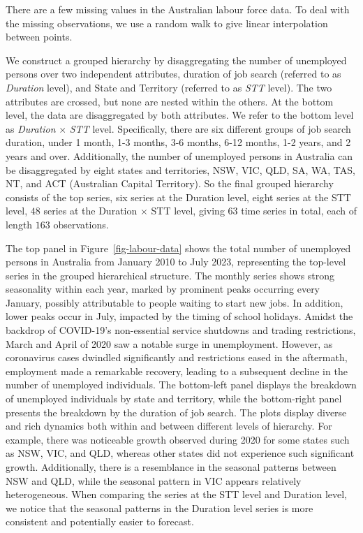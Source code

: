 \documentclass[11pt,a4paper,]{article}
\begin{document}
There are a few missing values in the Australian labour force data. To
deal with the missing observations, we use a random walk to give linear
interpolation between points.

We construct a grouped hierarchy by disaggregating the number of
unemployed persons over two independent attributes, duration of job
search (referred to as \emph{Duration} level), and State and Territory
(referred to as \emph{STT} level). The two attributes are crossed, but
none are nested within the others. At the bottom level, the data are
disaggregated by both attributes. We refer to the bottom level as
\emph{Duration} \(\times\) \emph{STT} level. Specifically, there are six
different groups of job search duration, under 1 month, 1-3 months, 3-6
months, 6-12 months, 1-2 years, and 2 years and over. Additionally, the
number of unemployed persons in Australia can be disaggregated by eight
states and territories, NSW, VIC, QLD, SA, WA, TAS, NT, and ACT
(Australian Capital Territory). So the final grouped hierarchy consists
of the top series, six series at the Duration level, eight series at the
STT level, \(48\) series at the Duration \(\times\) STT level, giving
\(63\) time series in total, each of length \(163\) observations.

The top panel in Figure~\ref{fig-labour-data} shows the total number of
unemployed persons in Australia from January 2010 to July 2023,
representing the top-level series in the grouped hierarchical structure.
The monthly series shows strong seasonality within each year, marked by
prominent peaks occurring every January, possibly attributable to people
waiting to start new jobs. In addition, lower peaks occur in July,
impacted by the timing of school holidays. Amidst the backdrop of
COVID-19's non-essential service shutdowns and trading restrictions,
March and April of 2020 saw a notable surge in unemployment. However, as
coronavirus cases dwindled significantly and restrictions eased in the
aftermath, employment made a remarkable recovery, leading to a
subsequent decline in the number of unemployed individuals. The
bottom-left panel displays the breakdown of unemployed individuals by
state and territory, while the bottom-right panel presents the breakdown
by the duration of job search. The plots display diverse and rich
dynamics both within and between different levels of hierarchy. For
example, there was noticeable growth observed during 2020 for some
states such as NSW, VIC, and QLD, whereas other states did not
experience such significant growth. Additionally, there is a resemblance
in the seasonal patterns between NSW and QLD, while the seasonal pattern
in VIC appears relatively heterogeneous. When comparing the series at
the STT level and Duration level, we notice that the seasonal patterns
in the Duration level series is more consistent and potentially easier
to forecast.
\end{document}
